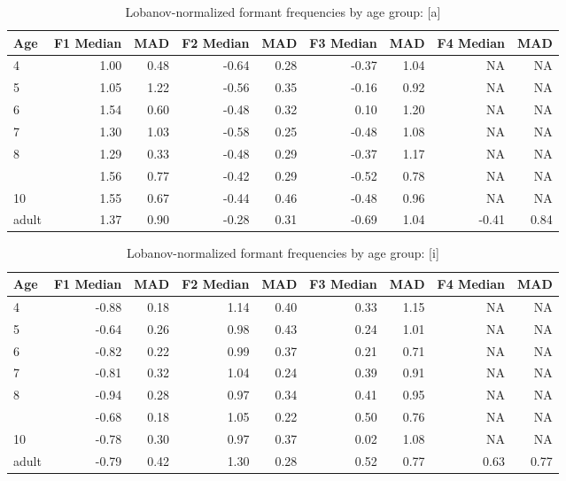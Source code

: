 \documentclass[
]{article}
\begin{document}
\begin{table}[!h]

\caption{\label{tab:lobanov-meas-tbl-a}Lobanov-normalized formant frequencies by age group: [a]}
\centering
\begin{tabular}[t]{lrrrrrrrr}
\toprule
Age & F1 Median & MAD & F2 Median & MAD & F3 Median & MAD & F4 Median & MAD\\
\midrule
4 & 1.00 & 0.48 & -0.64 & 0.28 & -0.37 & 1.04 & NA & NA\\
5 & 1.05 & 1.22 & -0.56 & 0.35 & -0.16 & 0.92 & NA & NA\\
6 & 1.54 & 0.60 & -0.48 & 0.32 & 0.10 & 1.20 & NA & NA\\
7 & 1.30 & 1.03 & -0.58 & 0.25 & -0.48 & 1.08 & NA & NA\\
8 & 1.29 & 0.33 & -0.48 & 0.29 & -0.37 & 1.17 & NA & NA\\
\addlinespace
9 & 1.56 & 0.77 & -0.42 & 0.29 & -0.52 & 0.78 & NA & NA\\
10 & 1.55 & 0.67 & -0.44 & 0.46 & -0.48 & 0.96 & NA & NA\\
adult & 1.37 & 0.90 & -0.28 & 0.31 & -0.69 & 1.04 & -0.41 & 0.84\\
\bottomrule
\end{tabular}
\end{table}

\begin{table}[!h]

\caption{\label{tab:lobanov-meas-tbl-i}Lobanov-normalized formant frequencies by age group: [i]}
\centering
\begin{tabular}[t]{lrrrrrrrr}
\toprule
Age & F1 Median & MAD & F2 Median & MAD & F3 Median & MAD & F4 Median & MAD\\
\midrule
4 & -0.88 & 0.18 & 1.14 & 0.40 & 0.33 & 1.15 & NA & NA\\
5 & -0.64 & 0.26 & 0.98 & 0.43 & 0.24 & 1.01 & NA & NA\\
6 & -0.82 & 0.22 & 0.99 & 0.37 & 0.21 & 0.71 & NA & NA\\
7 & -0.81 & 0.32 & 1.04 & 0.24 & 0.39 & 0.91 & NA & NA\\
8 & -0.94 & 0.28 & 0.97 & 0.34 & 0.41 & 0.95 & NA & NA\\
\addlinespace
9 & -0.68 & 0.18 & 1.05 & 0.22 & 0.50 & 0.76 & NA & NA\\
10 & -0.78 & 0.30 & 0.97 & 0.37 & 0.02 & 1.08 & NA & NA\\
adult & -0.79 & 0.42 & 1.30 & 0.28 & 0.52 & 0.77 & 0.63 & 0.77\\
\bottomrule
\end{tabular}
\end{table}
\end{document}
